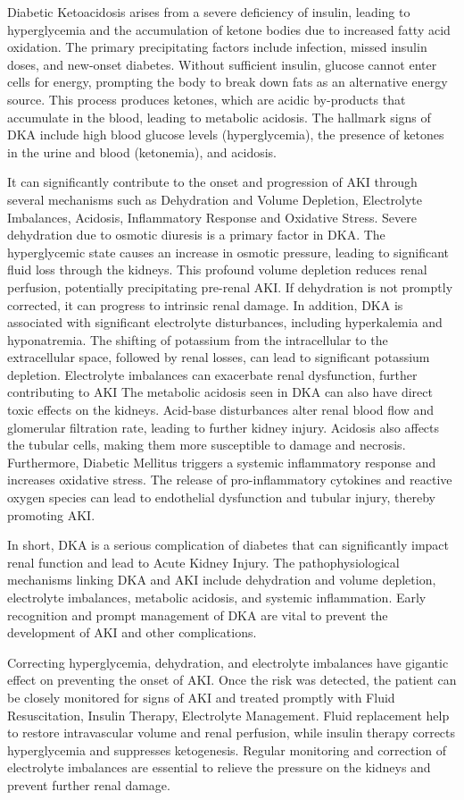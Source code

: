 \documentclass[../main.tex]{subfiles}
\begin{document}
Diabetic Ketoacidosis arises from a severe deficiency of insulin, leading to hyperglycemia and the accumulation of ketone bodies due to increased fatty acid oxidation. 
The primary precipitating factors include infection, missed insulin doses, and new-onset diabetes. 
Without sufficient insulin, glucose cannot enter cells for energy, prompting the body to break down fats as an alternative energy source. 
This process produces ketones, which are acidic by-products that accumulate in the blood, leading to metabolic acidosis. 
The hallmark signs of DKA include high blood glucose levels (hyperglycemia), the presence of ketones in the urine and blood (ketonemia), and acidosis.

It can significantly contribute to the onset and progression of AKI through several mechanisms such as Dehydration and Volume Depletion, Electrolyte Imbalances, Acidosis, Inflammatory Response and Oxidative Stress. 
Severe dehydration due to osmotic diuresis is a primary factor in DKA. 
The hyperglycemic state causes an increase in osmotic pressure, leading to significant fluid loss through the kidneys. 
This profound volume depletion reduces renal perfusion, potentially precipitating pre-renal AKI. 
If dehydration is not promptly corrected, it can progress to intrinsic renal damage.
In addition, DKA is associated with significant electrolyte disturbances, including hyperkalemia and hyponatremia. 
The shifting of potassium from the intracellular to the extracellular space, followed by renal losses, can lead to significant potassium depletion. 
Electrolyte imbalances can exacerbate renal dysfunction, further contributing to AKI
The metabolic acidosis seen in DKA can also have direct toxic effects on the kidneys. 
Acid-base disturbances alter renal blood flow and glomerular filtration rate, leading to further kidney injury. 
Acidosis also affects the tubular cells, making them more susceptible to damage and necrosis.
Furthermore, Diabetic Mellitus triggers a systemic inflammatory response and increases oxidative stress. 
The release of pro-inflammatory cytokines and reactive oxygen species can lead to endothelial dysfunction and tubular injury, thereby promoting AKI.

In short, DKA is a serious complication of diabetes that can significantly impact renal function and lead to Acute Kidney Injury. 
The pathophysiological mechanisms linking DKA and AKI include dehydration and volume depletion, electrolyte imbalances, metabolic acidosis, and systemic inflammation. 
Early recognition and prompt management of DKA are vital to prevent the development of AKI and other complications.

Correcting hyperglycemia, dehydration, and electrolyte imbalances have gigantic effect on preventing the onset of AKI. 
Once the risk was detected, the patient can be closely monitored for signs of AKI and treated promptly with Fluid Resuscitation, Insulin Therapy, Electrolyte Management. 
Fluid replacement help to restore intravascular volume and renal perfusion, while insulin therapy corrects hyperglycemia and suppresses ketogenesis.
Regular monitoring and correction of electrolyte imbalances are essential to relieve the pressure on the kidneys and prevent further renal damage.


\end{document}
